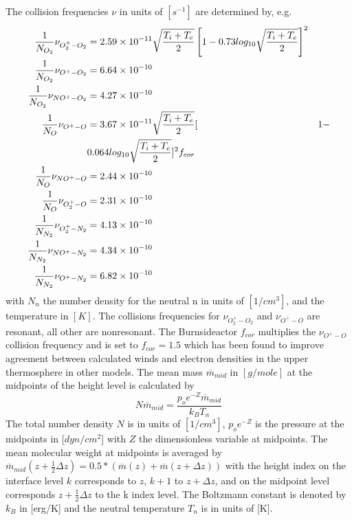 %
The collision frequencies $\nu$ in units of $[s^{-1}]$ are
determined by, e.g. \cite{Schunk00}
%
\begin{align}
 \frac{1}{N_{O_2}} \nu_{O_2^+ - O_2} &= 2.59\times 10^{-11}\sqrt{\frac{T_i +
 T_e}{2}}\left[ 1-0.73 log_{10}\sqrt{\frac{T_i +
 T_e}{2}}\right]^2  \\
\frac{1}{N_{O_2}} \nu_{O^+ - O_2}  &=6.64\times 10^{-10}  \\
\frac{1}{N_{O_2}} \nu_{NO^+ - O_2} &=4.27\times 10^{-10}  \\
\frac{1}{N_{O}} \nu_{O^+ - O}      &=3.67\times
10^{-11}\sqrt{\frac{T_i +
 T_e}{2}}[ & 1- \notag \\
  {} & 0.064 log_{10}\sqrt{\frac{T_i +
 T_e}{2}}]^2  f_{cor}  \\
\frac{1}{N_{O}} \nu_{NO^+ - O}    &=2.44\times 10^{-10}  \\
\frac{1}{N_{O}} \nu_{O_2^+ - O}   &=2.31\times 10^{-10}  \\
\frac{1}{N_{N_2}} \nu_{O_2^+ - N_2}&=4.13\times 10^{-10} \\
\frac{1}{N_{N_2}} \nu_{NO^+ - N_2} &=4.34\times 10^{-10} \\
\frac{1}{N_{N_2}} \nu_{O^+ - N_2}  &=6.82\times 10^{-10}
\end{align}
%
with $N_n$ the number density for the neutral n in units of
$[1/cm^3]$, and the temperature in $[K]$. The collisions frequencies
for $\nu_{O_2^+ - O_2}$ and $\nu_{O^+ - O}$ are resonant, all other
are nonresonant. The Burnsideactor $f_{cor}$
multiplies the $\nu_{O^+ - O}$ collision frequency and is set to
$f_{cor} =1.5$ which has been found to improve agreement between
calculated winds and electron densities in the upper thermosphere in
other models. The mean mass $ \overline{m}_{mid} $ in $[g/mole]$ at
the midpoints of the height level is calculated by
%
\begin{equation}
  N \overline{m}_{mid} = \frac{p_o e^{-Z} \overline{m}_{mid}}{k_B T_n}
\end{equation}
%
The total number density $N$ is in units of $[1/cm^3]$, $p_o e^{-Z}$
is the pressure at the midpoints in [$ dyn/cm^2 $] with $Z$ the
dimensionless variable at midpoints. The mean molecular weight at
midpoints is averaged by $\overline{m}_{mid}(z + \frac{1}{2} \Delta
z)= 0.5*(\overline{m}(z)+\overline{m}(z + \Delta z))$ with the
height index on the interface level $k$ corresponds to $z$, $k+1$ to
$z+ \Delta z$, and on the midpoint level corresponds $z +
\frac{1}{2} \Delta z$ to the k index level. The Boltzmann constant
is denoted by $k_B$ in [erg/K] and the neutral temperature
$T_n$ is in units of [K]. \\

